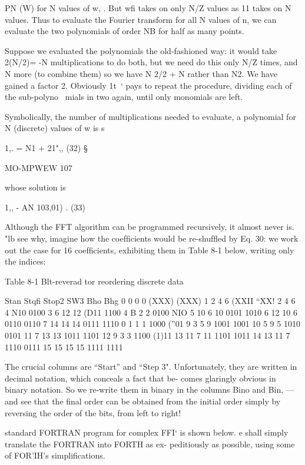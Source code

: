 {{{{{{{{PN (W) for N values of w, . But wﬁ takes on only N/Z values as 11
takes on N values. Thus to evaluate the Fourier transform for all
N values of n, we can evaluate the two polynomials of order NB
for half as many points.

Suppose we evaluated the polynomials the old-fashioned way: it
would take 2(N/2)= -N multiplications to do both, but we need do
this only N/Z times, and N more (to combine them) so we have
N 2/2 + N rather than N2. We have gained a factor 2. Obviously 1t~‘
pays to repeat the procedure, dividing each of the sub-polyno~
mials in two again, until only monomials are left.

Symbolically, the number of multiplications needed to evaluate,
a polynomial for N (discrete) values of w is s

1,. = N1 + 21",, (32) §

 

MO-MPWEW 107

whose solution is

1,, - AN 103,01) . (33)

Although the FFT algorithm can be programmed recursively, it
almost never is. "lb see why, imagine how the coefﬁcients would
be re-shufﬂed by Eq. 30: we work out the case for 16 coefﬁcients,
exhibiting them in Table 8-1 below, writing only the indices:

Table 8-1 Blt-reverad tor reordering discrete data

 

Stan Stqﬁ Stop2 SW3 Bho Bhg
0 0 0 0 (XXX) (XXX)
1 2 4 6 (XXII “XX!
2 4 6 4 N10 0100
3 6 12 12 (D11 1100
4 B 2 2 0100 NIO
5 10 6 10 0101 1010
6 12 10 6 0110 0110
7 14 14 14 0111 1110
0 1 1 1 1000 (”01
9 3 5 9 1001 1001
10 5 9 5 1010 0101
11 7 13 13 1011 1101
12 9 3 3 1100 (1)11
13 11 7 11 1101 1011
14 13 11 7 1110 0111
15 15 15 15 1111 1111

 

 

The crucial columns are “Start” and “Step 3". Unfortunately, they
are written in decimal notation, which conceals a fact that be-
comes glaringly obvious in binary notation. So we re-write them
in binary in the columns Bino and Bin, —and see that the ﬁnal
order can be obtained from the initial order simply by reversing
the order of the bits, from left to right!

standard FORTRAN program for complex FFI‘ is shown below.
e shall simply translate the FORTRAN into FORTH as ex-
peditiously as possible, using some of FOR'IH's simpliﬁcations.

}}}}}}}}
